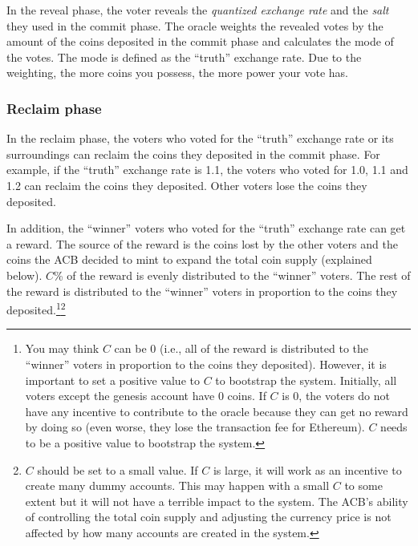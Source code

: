 \documentclass[dvipdfmx,a4paper]{article}
\begin{document}
In the reveal phase, the voter reveals the \textit{quantized exchange rate} and the \textit{salt} they used in the commit phase. The oracle weights the revealed votes by the amount of the coins deposited in the commit phase and calculates the mode of the votes. The mode is defined as the ``truth'' exchange rate. Due to the weighting, the more coins you possess, the more power your vote has.

\subsubsection{Reclaim phase}

In the reclaim phase, the voters who voted for the ``truth'' exchange rate or its surroundings can reclaim the coins they deposited in the commit phase. For example, if the ``truth'' exchange rate is 1.1, the voters who voted for 1.0, 1.1 and 1.2 can reclaim the coins they deposited. Other voters lose the coins they deposited.

In addition, the ``winner'' voters who voted for the ``truth'' exchange rate can get a reward. The source of the reward is the coins lost by the other voters and the coins the ACB decided to mint to expand the total coin supply (explained below). $C$\% of the reward is evenly distributed to the ``winner'' voters. The rest of the reward is distributed to the ``winner'' voters in proportion to the coins they deposited.\footnote{You may think $C$ can be 0 (i.e., all of the reward is distributed to the ``winner'' voters in proportion to the coins they deposited). However, it is important to set a positive value to $C$ to bootstrap the system. Initially, all voters except the genesis account have 0 coins. If $C$ is 0, the voters do not have any incentive to contribute to the oracle because they can get no reward by doing so (even worse, they lose the transaction fee for Ethereum). $C$ needs to be a positive value to bootstrap the system.}\footnote{$C$ should be set to a small value. If $C$ is large, it will work as an incentive to create many dummy accounts. This may happen with a small $C$ to some extent but it will not have a terrible impact to the system. The ACB's ability of controlling the total coin supply and adjusting the currency price is not affected by how many accounts are created in the system.}
\end{document}
